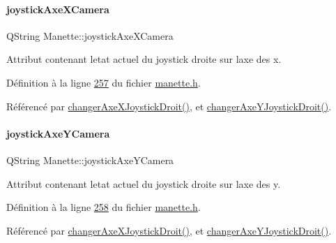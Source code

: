 \mbox{\label{class_manette_a0ca05a5c08455e74c8d944b96d8124a6}} 
\paragraph{\texorpdfstring{joystick\+Axe\+X\+Camera}{joystickAxeXCamera}}
{\footnotesize\ttfamily Q\+String Manette\+::joystick\+Axe\+X\+Camera\hspace{0.3cm}{\ttfamily [private]}}



Attribut contenant l\textquotesingle{}etat actuel du joystick droite sur l\textquotesingle{}axe des x. 



Définition à la ligne \hyperlink{manette_8h_source_l00257}{257} du fichier \hyperlink{manette_8h_source}{manette.\+h}.



Référencé par \hyperlink{manette_8cpp_source_l00455}{changer\+Axe\+X\+Joystick\+Droit()}, et \hyperlink{manette_8cpp_source_l00467}{changer\+Axe\+Y\+Joystick\+Droit()}.

\mbox{\label{class_manette_ab635d71c9e829d8950b9bbd13b9cdb01}} 
\paragraph{\texorpdfstring{joystick\+Axe\+Y\+Camera}{joystickAxeYCamera}}
{\footnotesize\ttfamily Q\+String Manette\+::joystick\+Axe\+Y\+Camera\hspace{0.3cm}{\ttfamily [private]}}



Attribut contenant l\textquotesingle{}etat actuel du joystick droite sur l\textquotesingle{}axe des y. 



Définition à la ligne \hyperlink{manette_8h_source_l00258}{258} du fichier \hyperlink{manette_8h_source}{manette.\+h}.



Référencé par \hyperlink{manette_8cpp_source_l00455}{changer\+Axe\+X\+Joystick\+Droit()}, et \hyperlink{manette_8cpp_source_l00467}{changer\+Axe\+Y\+Joystick\+Droit()}.

